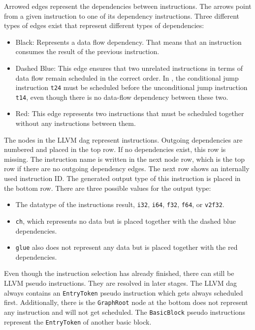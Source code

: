 Arrowed edges represent the dependencies between instructions.
The arrows point from a given instruction to one of its dependency instructions.
Three different types of edges exist that represent different types of dependencies:
\begin{itemize}
    \item Black: Represents a data flow dependency. That means that an instruction consumes the result of the previous instruction.
    \item Dashed Blue: This edge ensures that two unrelated instructions in terms of data flow remain scheduled in the correct order.
        In , the conditional jump instruction \lstinline|t24| must be scheduled before the unconditional jump instruction \lstinline|t14|, even though there is no data-flow dependency between these two.
    \item Red: This edge represents two instructions that must be scheduled together without any instructions between them.
\end{itemize}

The nodes in the LLVM \ac{dag} represent instructions.
Outgoing dependencies are numbered and placed in the top row.
If no dependencies exist, this row is missing.
The instruction name is written in the next node row, which is the top row if there are no outgoing dependency edges.
The next row shows an internally used instruction ID.
The generated output type of this instruction is placed in the bottom row. 
There are three possible values for the output type:
\begin{itemize}
    \item The datatype of the instructions result, \eg \lstinline|i32|, \lstinline|i64|, \lstinline|f32|, \lstinline|f64|, or \lstinline|v2f32|.
    \item \lstinline|ch|, which represents no data but is placed together with the dashed blue dependencies.
    \item \lstinline|glue| also does not represent any data but is placed together with the red dependencies.
\end{itemize}

Even though the instruction selection has already finished, there can still be LLVM pseudo instructions.
They are resolved in later stages.
The LLVM \ac{dag} always contains an \lstinline|EntryToken| pseudo instruction which gets always scheduled first.
Additionally, there is the \lstinline|GraphRoot| node at the bottom does not represent any instruction and will not get scheduled.
The \lstinline|BasicBlock| pseudo instructions represent the \lstinline|EntryToken| of another basic block.

